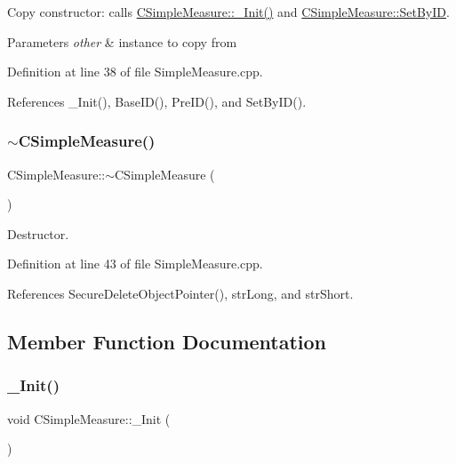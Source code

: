 Copy constructor\+: calls \hyperlink{classCSimpleMeasure_ada8744ac5a824143904a2ecaef2b0b70}{C\+Simple\+Measure\+::\+\_\+\+Init()} and \hyperlink{classCSimpleMeasure_a6945aa333dca5623482d38cd9a7e3225}{C\+Simple\+Measure\+::\+Set\+By\+ID}. 


\begin{DoxyParams}{Parameters}
{\em other} & instance to copy from \\
\hline
\end{DoxyParams}


Definition at line 38 of file Simple\+Measure.\+cpp.



References \+\_\+\+Init(), Base\+I\+D(), Pre\+I\+D(), and Set\+By\+I\+D().

\mbox{\label{classCSimpleMeasure_a6a691614fc884c34c9f6ad36c670587b}} 
\subsubsection{\texorpdfstring{$\sim$\+C\+Simple\+Measure()}{~CSimpleMeasure()}}
{\footnotesize\ttfamily C\+Simple\+Measure\+::$\sim$\+C\+Simple\+Measure (\begin{DoxyParamCaption}{ }\end{DoxyParamCaption})}



Destructor. 



Definition at line 43 of file Simple\+Measure.\+cpp.



References Secure\+Delete\+Object\+Pointer(), str\+Long, and str\+Short.



\subsection{Member Function Documentation}
\mbox{\label{classCSimpleMeasure_ada8744ac5a824143904a2ecaef2b0b70}} 
\subsubsection{\texorpdfstring{\+\_\+\+Init()}{\_Init()}}
{\footnotesize\ttfamily void C\+Simple\+Measure\+::\+\_\+\+Init (\begin{DoxyParamCaption}{ }\end{DoxyParamCaption})\hspace{0.3cm}{\ttfamily [protected]}}



